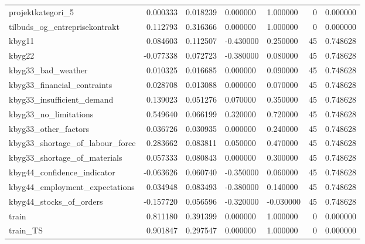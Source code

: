 \begin{landscape}
\begin{longtable}[h!]{lrrllrr}
projektkategori_5 & 0.000333 & 0.018239 & 0.000000 & 1.000000 & 0 & 0.000000 \\
tilbuds_og_entreprisekontrakt & 0.112793 & 0.316366 & 0.000000 & 1.000000 & 0 & 0.000000 \\
kbyg11 & 0.084603 & 0.112507 & -0.430000 & 0.250000 & 45 & 0.748628 \\
kbyg22 & -0.077338 & 0.072723 & -0.380000 & 0.080000 & 45 & 0.748628 \\
kbyg33_bad_weather & 0.010325 & 0.016685 & 0.000000 & 0.090000 & 45 & 0.748628 \\
kbyg33_financial_contraints & 0.028708 & 0.013088 & 0.000000 & 0.070000 & 45 & 0.748628 \\
kbyg33_insufficient_demand & 0.139023 & 0.051276 & 0.070000 & 0.350000 & 45 & 0.748628 \\
kbyg33_no_limitations & 0.549640 & 0.066199 & 0.320000 & 0.720000 & 45 & 0.748628 \\
kbyg33_other_factors & 0.036726 & 0.030935 & 0.000000 & 0.240000 & 45 & 0.748628 \\
kbyg33_shortage_of_labour_force & 0.283662 & 0.083811 & 0.050000 & 0.470000 & 45 & 0.748628 \\
kbyg33_shortage_of_materials & 0.057333 & 0.080843 & 0.000000 & 0.300000 & 45 & 0.748628 \\
kbyg44_confidence_indicator & -0.063626 & 0.060740 & -0.350000 & 0.060000 & 45 & 0.748628 \\
kbyg44_employment_expectations & 0.034948 & 0.083493 & -0.380000 & 0.140000 & 45 & 0.748628 \\
kbyg44_stocks_of_orders & -0.157720 & 0.056596 & -0.320000 & -0.030000 & 45 & 0.748628 \\
train & 0.811180 & 0.391399 & 0.000000 & 1.000000 & 0 & 0.000000 \\
train_TS & 0.901847 & 0.297547 & 0.000000 & 1.000000 & 0 & 0.000000 \\
\end{longtable}\end{landscape}
